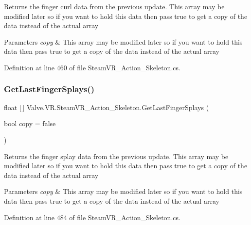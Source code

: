 Returns the finger curl data from the previous update. This array may be modified later so if you want to hold this data then pass true to get a copy of the data instead of the actual array 


\begin{DoxyParams}{Parameters}
{\em copy} & This array may be modified later so if you want to hold this data then pass true to get a copy of the data instead of the actual array\\
\hline
\end{DoxyParams}


Definition at line 460 of file Steam\+V\+R\+\_\+\+Action\+\_\+\+Skeleton.\+cs.

\mbox{\label{class_valve_1_1_v_r_1_1_steam_v_r___action___skeleton_ae9e50b9a7c3151ba215a543692e737dc}} 
\subsubsection{\texorpdfstring{GetLastFingerSplays()}{GetLastFingerSplays()}}
{\footnotesize\ttfamily float \mbox{[}$\,$\mbox{]} Valve.\+V\+R.\+Steam\+V\+R\+\_\+\+Action\+\_\+\+Skeleton.\+Get\+Last\+Finger\+Splays (\begin{DoxyParamCaption}\item[{bool}]{copy = {\ttfamily false} }\end{DoxyParamCaption})}



Returns the finger splay data from the previous update. This array may be modified later so if you want to hold this data then pass true to get a copy of the data instead of the actual array 


\begin{DoxyParams}{Parameters}
{\em copy} & This array may be modified later so if you want to hold this data then pass true to get a copy of the data instead of the actual array\\
\hline
\end{DoxyParams}


Definition at line 484 of file Steam\+V\+R\+\_\+\+Action\+\_\+\+Skeleton.\+cs.

\mbox{\label{class_valve_1_1_v_r_1_1_steam_v_r___action___skeleton_af004d59f2ca4e023411e645e9d8ea472}} 
